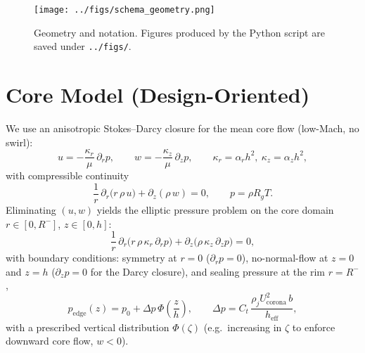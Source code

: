 \documentclass[11pt,a4paper]{article}
\begin{document}
\begin{figure}[t]
  \centering
  \texttt{[image: ../figs/schema\_geometry.png]}
  \caption{Geometry and notation. Figures produced by the Python script are saved under \texttt{../figs/}.}
  \label{fig:geometry}
\end{figure}

\section{Core Model (Design-Oriented)}
We use an anisotropic Stokes--Darcy closure for the mean core flow (low-Mach, no swirl):
\begin{equation}
  u = -\frac{\kappa_r}{\mu}\,\partial_r p,\qquad
  w = -\frac{\kappa_z}{\mu}\,\partial_z p,\qquad
  \kappa_r=\alpha_r h^2,\ \kappa_z=\alpha_z h^2,
  \label{eq:darcy}
\end{equation}
with compressible continuity
\begin{equation}
  \frac{1}{r}\,\partial_r\!\big(r\,\rho\,u\big)+\partial_z(\rho\,w)=0,\qquad
  p=\rho R_g T.
  \label{eq:cont_state}
\end{equation}
Eliminating $(u,w)$ yields the elliptic pressure problem on the core domain $r\in[0,R^-]$, $z\in[0,h]$:
\begin{equation}
  \frac{1}{r}\,\partial_r\!\big(r\,\rho\,\kappa_r\,\partial_r p\big)+\partial_z\!\big(\rho\,\kappa_z\,\partial_z p\big)=0,
  \label{eq:elliptic_dim}
\end{equation}
with boundary conditions: symmetry at $r=0$ ($\partial_r p=0$), no-normal-flow at $z=0$ and $z=h$ ($\partial_z p=0$ for the Darcy closure), and sealing pressure at the rim $r=R^-$,
\begin{equation}
  p_\mathrm{edge}(z)=p_0 + \Delta p\,\Phi\!\left(\frac{z}{h}\right),
  \qquad \Delta p = C_t\,\frac{\rho_j U_\mathrm{corona}^2\,b}{h_\mathrm{eff}},
  \label{eq:rim_bc}
\end{equation}
with a prescribed vertical distribution $\Phi(\zeta)$ (e.g.\ increasing in $\zeta$ to enforce downward core flow, $w<0$).
\end{document}
